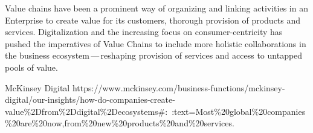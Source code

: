 %
%

Value chains have been a prominent way of organizing and linking activities in an Enterprise to create value
for its customers, thorough provision of products and services.
Digitalization and the increasing focus on consumer-centricity
has pushed the imperatives of Value Chains to include more holistic collaborations in the
business ecosystem\,---\,reshaping provision of services and access to untapped pools of value.

{McKinsey Digital}
{https://www.mckinsey.com/business-functions/mckinsey-digital/our-insights/how-do-companies-create-value\%2Dfrom\%2Ddigital\%2Decosystems\#:~:text=Most\%20global\%20companies\%20are\%20now,from\%20new\%20products\%20and\%20services.}



